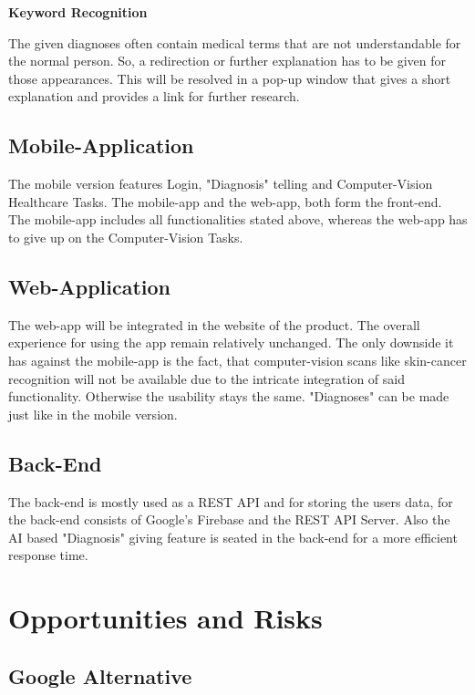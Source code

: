 \documentclass[12pt]{article}
\theoremstyle{definition}
\begin{document}
{\bf Keyword Recognition}

The given diagnoses often contain medical terms that are not understandable for the normal person. So, a redirection or further explanation has to be given for those appearances.
This will be resolved in a pop-up window that gives a short explanation and provides a link for further research.    
    
\subsection{Mobile-Application}

The mobile version features Login, "Diagnosis" telling and Computer-Vision Healthcare Tasks. The mobile-app and the web-app, both form the front-end. The mobile-app includes all functionalities stated above, whereas the web-app has to give up on the Computer-Vision Tasks. 
     
\subsection{Web-Application}

The web-app will be integrated in the website of the product. The overall experience for using the app remain relatively unchanged. The only downside it has against the mobile-app is the fact, that computer-vision scans like skin-cancer recognition will not be available due to the intricate integration of said functionality.
Otherwise the usability stays the same. "Diagnoses" can be made just like in the mobile version. 

\subsection{Back-End}

The back-end is mostly used as a REST API and for storing the users data, for the back-end consists of Google's Firebase and the REST API Server.
Also the AI based "Diagnosis" giving feature is seated in the back-end for a more efficient response time.


\pagebreak



\section{Opportunities and Risks}

\subsection{Google Alternative}
\end{document}
